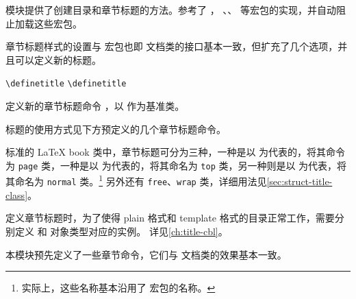 \documentclass{cusdoc}
\begin{document}
 模块提供了创建目录和章节标题的方法。参考了 ，
、、 等宏包的实现，并自动阻止加载这些宏包。

章节标题样式的设置与  宏包也即 \CTeX 文档类的接口基本一致，但扩充了几个选项，并且可以定义新的标题。

\begin{function}{}
  \begin{syntax}
    \verb|\definetitle|  
    \verb|\definetitle|   
  \end{syntax}
定义新的章节标题命令 ，以  作为基准类。

标题的使用方式见下方预定义的几个章节标题命令。
\end{function}

标准的 {\LaTeX} book 类中，章节标题可分为三种，一种是以  为代表的，\CusTeX 将其命令为 \texttt{page} 类，一种是以  为代表的，\CusTeX 将其命名为 \texttt{top} 类，另一种则是以  为代表，\CusTeX 将其命名为 \texttt{normal} 类。\footnote{实际上，这些名称基本沿用了  宏包的名称。}
另外还有 \texttt{free}、\texttt{wrap} 类，详细用法见\cref{sec:struct-title-class}。

\begin{texnote}
定义章节标题时，为了使得 plain 格式和 template 格式的目录正常工作，需要分别定义
 和  对象类型对应的实例。
详见\cref{ch:title-cbl}。
\end{texnote}

本模块预先定义了一些章节命令，它们与  文档类的效果基本一致。
\end{document}
